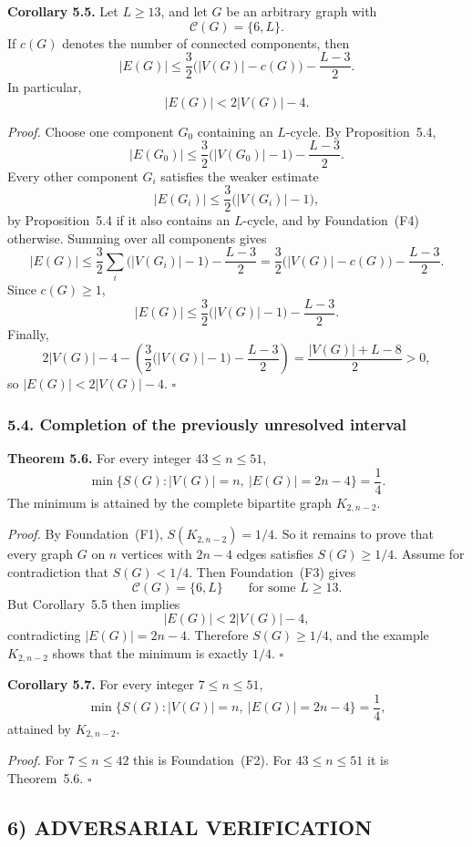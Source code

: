 \medskip
\textbf{Corollary 5.5.}
Let $L\ge 13$, and let $G$ be an arbitrary graph with
\[
\mathcal C(G)=\{6,L\}.
\]
If $c(G)$ denotes the number of connected components, then
\[
|E(G)|\le \frac32\bigl(|V(G)|-c(G)\bigr)-\frac{L-3}{2}.
\]
In particular,
\[
|E(G)|<2|V(G)|-4.
\]

\medskip
\textit{Proof.}
Choose one component $G_0$ containing an $L$-cycle.
By Proposition~5.4,
\[
|E(G_0)|\le \frac32\bigl(|V(G_0)|-1\bigr)-\frac{L-3}{2}.
\]
Every other component $G_i$ satisfies the weaker estimate
\[
|E(G_i)|\le \frac32\bigl(|V(G_i)|-1\bigr),
\]
by Proposition~5.4 if it also contains an $L$-cycle, and by Foundation~(F4) otherwise.
Summing over all components gives
\[
|E(G)|\le \frac32\sum_i\bigl(|V(G_i)|-1\bigr)-\frac{L-3}{2}
= \frac32\bigl(|V(G)|-c(G)\bigr)-\frac{L-3}{2}.
\]
Since $c(G)\ge 1$,
\[
|E(G)|\le \frac32\bigl(|V(G)|-1\bigr)-\frac{L-3}{2}.
\]
Finally,
\[
2|V(G)|-4-\left(\frac32\bigl(|V(G)|-1\bigr)-\frac{L-3}{2}\right)
=\frac{|V(G)|+L-8}{2}>0,
\]
so $|E(G)|<2|V(G)|-4$.
\hfill$\square$

\subsubsection*{5.4. Completion of the previously unresolved interval}

\textbf{Theorem 5.6.}
For every integer $43\le n\le 51$,
\[
\min\{S(G): |V(G)|=n,\ |E(G)|=2n-4\}=\frac14.
\]
The minimum is attained by the complete bipartite graph $K_{2,n-2}$.

\medskip
\textit{Proof.}
By Foundation~(F1), $S(K_{2,n-2})=1/4$.
So it remains to prove that every graph $G$ on $n$ vertices with $2n-4$ edges satisfies $S(G)\ge 1/4$.
Assume for contradiction that $S(G)<1/4$.
Then Foundation~(F3) gives
\[
\mathcal C(G)=\{6,L\}
\qquad\text{for some }L\ge 13.
\]
But Corollary~5.5 then implies
\[
|E(G)|<2|V(G)|-4,
\]
contradicting $|E(G)|=2n-4$.
Therefore $S(G)\ge 1/4$, and the example $K_{2,n-2}$ shows that the minimum is exactly $1/4$.
\hfill$\square$

\medskip
\textbf{Corollary 5.7.}
For every integer $7\le n\le 51$,
\[
\min\{S(G): |V(G)|=n,\ |E(G)|=2n-4\}=\frac14,
\]
attained by $K_{2,n-2}$.

\medskip
\textit{Proof.}
For $7\le n\le 42$ this is Foundation~(F2). For $43\le n\le 51$ it is Theorem~5.6.
\hfill$\square$

\subsection*{6) ADVERSARIAL VERIFICATION}

